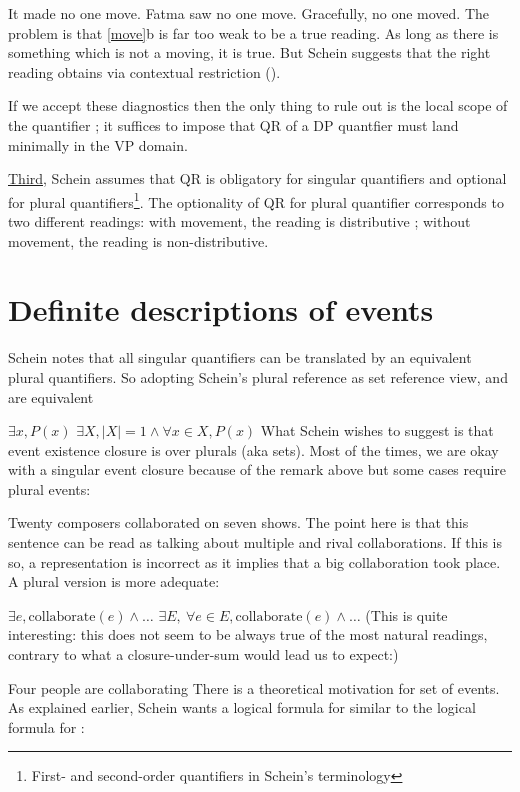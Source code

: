 \pex
\a It made no one move.
\a Fatma saw no one move.
\a Gracefully, no one moved.
\xe
%
The problem is that \cref{move}b is far too weak to be a true  reading. As long as there is something which is not a moving, it is true. But Schein suggests that the right reading obtains via contextual restriction ().

If we accept these diagnostics then the only thing to rule out is the local scope of the quantifier ; it suffices to impose that QR of a DP quantfier must land minimally in the VP domain.

\underline{Third,} Schein assumes that QR is obligatory for singular quantifiers and optional for plural quantifiers\footnote{First- and second-order quantifiers in Schein's terminology}. The optionality of QR for plural quantifier corresponds to two different readings: with movement, the reading is distributive ; without movement, the reading is non-distributive. 

\section{Definite descriptions of events}

Schein notes that all singular quantifiers can be translated by an equivalent plural quantifiers. So adopting Schein's plural reference as set reference view, \cnextx[a] and \cnextx[b] are equivalent

\pex
\a 
$\exists x, P(x)$
\a 
$\exists X, |X| = 1\wedge \forall x\in X, P(x) $
\xe
%
What Schein wishes to suggest is that event existence closure is over plurals (aka sets). Most of the times, we are okay with a singular event closure because of the remark above but some cases require plural events:

\ex
Twenty composers collaborated on seven shows.
\xe
%
The point here is that this sentence can be read as talking about multiple and rival collaborations. If this is so, a representation is incorrect as it implies that a big collaboration took place. A plural version is more adequate:

\pex
\a 
$\exists e, \text{collaborate}(e) \wedge \ldots$
\a 
$\exists E,\ \forall e\in E,  \text{collaborate}(e) \wedge \ldots$
\xe
%
(This is quite interesting: this does not seem to be always true of the most natural readings, contrary to what a closure-under-sum would lead us to expect:)

\ex
Four people are collaborating
\xe
%
There is a theoretical motivation for set of events. As explained earlier, Schein wants a logical formula for \cnextx[a] similar to the logical formula for \cnextx[b]:

